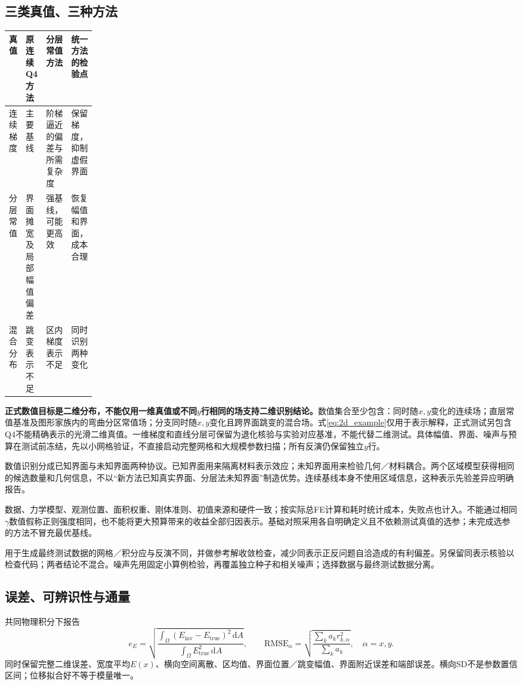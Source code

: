 \documentclass[11pt,a4paper]{ctexart}
\newcommand{\dd}{\,\mathrm d}
\begin{document}
\subsection{三类真值、三种方法}
\begin{center}
\small
\begin{tabularx}{\linewidth}{@{}p{0.17\linewidth}XXX@{}}
\toprule
真值 & 原连续Q4方法 & 分层常值方法 & 统一方法的检验点\\\midrule
连续梯度 & 主要基线 & 阶梯逼近的偏差与所需复杂度 & 保留梯度，抑制虚假界面\\
分层常值 & 界面摊宽及局部幅值偏差 & 强基线，可能更高效 & 恢复幅值和界面，成本合理\\
混合分布 & 跳变表示不足 & 区内梯度表示不足 & 同时识别两种变化\\
\bottomrule
\end{tabularx}
\end{center}
\textbf{正式数值目标是二维分布，不能仅用一维真值或不同$y$行相同的场支持二维识别结论。}数值集合至少包含：同时随$x,y$变化的连续场；直层常值基准及图形家族内的弯曲分区常值场；分支同时随$x,y$变化且跨界面跳变的混合场。式\eqref{eq:2d_example}仅用于表示解释，正式测试另包含Q4不能精确表示的光滑二维真值。一维梯度和直线分层可保留为退化核验与实验对应基准，不能代替二维测试。具体幅值、界面、噪声与预算在测试前冻结，先以小网格验证，不直接启动完整网格和大规模参数扫描；所有反演仍保留独立$y$行。

数值识别分成已知界面与未知界面两种协议。已知界面用来隔离材料表示效应；未知界面用来检验几何／材料耦合。两个区域模型获得相同的候选数量和几何信息，不以“新方法已知真实界面、分层法未知界面”制造优势。连续基线本身不使用区域信息，这种表示先验差异应明确报告。

数据、力学模型、观测位置、面积权重、刚体准则、初值来源和硬件一致；按实际总FE计算和耗时统计成本，失败点也计入。不能通过相同$\gamma$数值假称正则强度相同，也不能将更大预算带来的收益全部归因表示。基础对照采用各自明确定义且不依赖测试真值的选参；未完成选参的方法不冒充最优基线。

用于生成最终测试数据的网格／积分应与反演不同，并做参考解收敛检查，减少同表示正反问题自洽造成的有利偏差。另保留同表示核验以检查代码；两者结论不混合。噪声先用固定小算例检验，再覆盖独立种子和相关噪声；选择数据与最终测试数据分离。

\subsection{误差、可辨识性与通量}
共同物理积分下报告
\begin{equation}
 e_E=\sqrt{\frac{\int_\Omega(E_{\mathrm{inv}}-E_{\mathrm{true}})^2\dd A}
                       {\int_\Omega E_{\mathrm{true}}^2\dd A}},
 \qquad
 \mathrm{RMSE}_\alpha=\sqrt{\frac{\sum_k a_k r_{k,\alpha}^2}{\sum_k a_k}},
 \quad\alpha=x,y.
\end{equation}
同时保留完整二维误差、宽度平均$E(x)$、横向空间离散、区均值、界面位置／跳变幅值、界面附近误差和端部误差。横向SD不是参数置信区间；位移拟合好不等于模量唯一。
\end{document}
